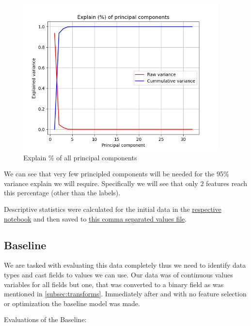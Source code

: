 \documentclass[12pt, a4paper]{article}
\begin{document}
\begin{figure}[H]
    \begin{center}
        \includegraphics[width=0.95\textwidth]{figures/Explain of all principaled components.png}
    \end{center}
    \caption{Explain \% of all principal components}\label{fig:PCA search}
\end{figure}

    We can see that very few principled components will be needed for the 95\% variance explain we will require. Specifically we will see that only $2$ features reach this percentage (other than the labels).
    \newlinw

\begin{multicols}{2}

    Descriptive statistics were calculated for the initial data in the \href{https://github.com/ArisPodotas/Assignment-2-MLICB/blob/master/notebooks/Feeling%20the%20data.ipynb}{respective notebook} and then saved to \href{https://github.com/ArisPodotas/Assignment-2-MLICB/blob/master/data/statistics.csv}{this comma separated values file}.
    \newline

    \subsection{Baseline} \label{subsec:baseline}

    We are tasked with evaluating this data completely thus we need to identify data types and cast fields to values we can use. Our data was of continuous values variables for all fields but one, that was converted to a binary field as was mentioned in \ref{subsec:transforms}. Immediately after and with no feature selection or optimization the baseline model was made.
    \newline

    Evaluations of the Baseline:
    \newline

\end{multicols}
\end{document}
